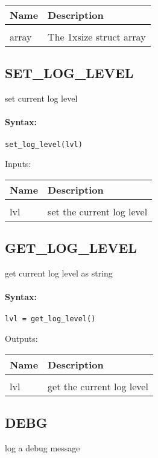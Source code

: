 \begin{tabular}{|l|p{5cm}|}
\hline
\textbf{Name} & \textbf{Description} \\
\hline \hline \\
array & The 1xsize struct array  \\ \hline
\end{tabular}

\subsection{SET\_LOG\_LEVEL}

set current log level

\paragraph{Syntax:} \verb|set_log_level(lvl)|

Inputs:

\begin{tabular}{|l|p{5cm}|}
\hline
\textbf{Name} & \textbf{Description} \\
\hline \hline \\
lvl & set the current log level  \\ \hline
\end{tabular}

\subsection{GET\_LOG\_LEVEL}

get current log level as string

\paragraph{Syntax:} \verb|lvl = get_log_level()|

Outputs:

\begin{tabular}{|l|p{5cm}|}
\hline
\textbf{Name} & \textbf{Description} \\
\hline \hline \\
lvl & get the current log level  \\ \hline
\end{tabular}

\subsection{DEBG}

log a debug message

